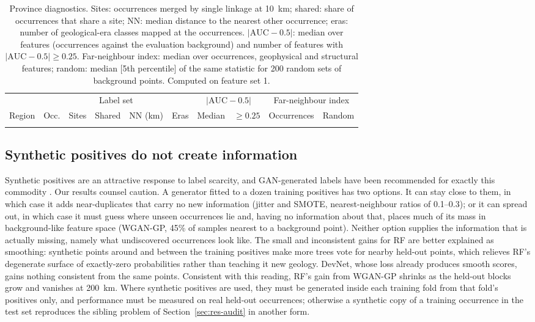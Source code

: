 \documentclass[pdflatex,sn-apa]{sn-jnl}
\begin{document}
\begin{table}[t]
\caption{Province diagnostics. Sites: occurrences merged by single linkage at 10~km; shared: share of occurrences that share a site; NN: median distance to the nearest other occurrence; eras: number of geological-era classes mapped at the occurrences. $|\mathrm{AUC}-0.5|$: median over features (occurrences against the evaluation background) and number of features with $|\mathrm{AUC}-0.5| \geq 0.25$. Far-neighbour index: median over occurrences, geophysical and structural features; random: median [5th percentile] of the same statistic for 200 random sets of background points. Computed on feature set 1.}\label{tab:region-diag}
\scriptsize
\setlength{\tabcolsep}{2.5pt}
\begin{tabular*}{\textwidth}{@{\extracolsep\fill}lccccccccc}
\toprule
 & \multicolumn{5}{c}{Label set} & \multicolumn{2}{c}{$|\mathrm{AUC}-0.5|$} & \multicolumn{2}{c}{Far-neighbour index} \\
\cmidrule(lr){2-6}\cmidrule(lr){7-8}\cmidrule(lr){9-10}
Region & Occ. & Sites & Shared & NN (km) & Eras & Median & $\geq 0.25$ & Occurrences & Random \\
\midrule
\botrule
\end{tabular*}
\end{table}

\subsection{Synthetic positives do not create information}\label{sec:disc-gan}

Synthetic positives are an attractive response to label scarcity, and GAN-generated labels have been recommended for exactly this commodity \citep{Parsa2025}. Our results counsel caution. A generator fitted to a dozen training positives has two options. It can stay close to them, in which case it adds near-duplicates that carry no new information (jitter and SMOTE, nearest-neighbour ratios of 0.1--0.3); or it can spread out, in which case it must guess where unseen occurrences lie and, having no information about that, places much of its mass in background-like feature space (WGAN-GP, 45\% of samples nearest to a background point). Neither option supplies the information that is actually missing, namely what undiscovered occurrences look like. The small and inconsistent gains for RF are better explained as smoothing: synthetic points around and between the training positives make more trees vote for nearby held-out points, which relieves RF's degenerate surface of exactly-zero probabilities rather than teaching it new geology. DevNet, whose loss already produces smooth scores, gains nothing consistent from the same points. Consistent with this reading, RF's gain from WGAN-GP shrinks as the held-out blocks grow and vanishes at 200~km. Where synthetic positives are used, they must be generated inside each training fold from that fold's positives only, and performance must be measured on real held-out occurrences; otherwise a synthetic copy of a training occurrence in the test set reproduces the sibling problem of Section~\ref{sec:res-audit} in another form.
\end{document}
